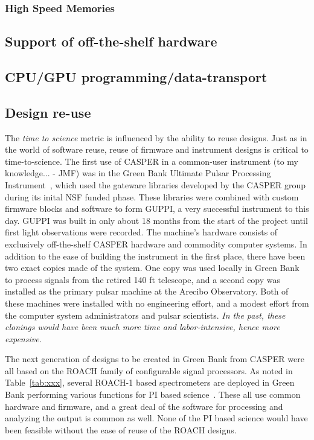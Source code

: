 \documentclass{ws-jai}
\begin{document}
\subsubsection{High Speed Memories} \label{sec: HSM}


\subsection{Support of off-the-shelf hardware}

\subsection{CPU/GPU programming/data-transport}

\subsection{Design re-use}
The \emph{time to science} metric is influenced by the ability to
reuse designs.  Just as in the world of software reuse, reuse of
firmware and instrument designs is critical to time-to-science.  The
first use of CASPER in a common-user instrument (to my knowledge... -
JMF) was in the Green Bank Ultimate Pulsar Processing
Instrument~\cite{duplain2008}, which used the gateware libraries
developed by the CASPER group during its inital NSF funded phase.
These libraries were combined with custom firmware blocks and software
to form GUPPI, a very successful instrument to this day.  GUPPI was
built in only about 18 months from the start of the project until
first light observations were recorded.  The machine's hardware
consists of exclusively off-the-shelf CASPER hardware and commodity
computer systems.  In addition to the ease of building the instrument
in the first place, there have been two exact copies made of the
system.  One copy was used locally in Green Bank to process signals
from the retired 140 ft telescope, and a second copy was installed as
the primary pulsar machine at the Arecibo Observatory.  Both of these
machines were installed with no engineering effort, and a modest
effort from the computer system administrators and pulsar scientists.
\emph{In the past, these clonings would have been much more time and
  labor-intensive, hence more expensive.}

The next generation of designs to be created in Green Bank from CASPER
were all based on the ROACH family of configurable signal processors.
As noted in Table~\ref{tab:xxx}, several ROACH-1 based spectrometers
are deployed in Green Bank performing various functions for PI based
science~\cite{ellingson, ghigo/heatherly,...}.  These all use common
hardware and firmware, and a great deal of the software for processing
and analyzing the output is common as well.  None of the PI based
science would have been feasible without the ease of reuse of the
ROACH designs.
\end{document}
